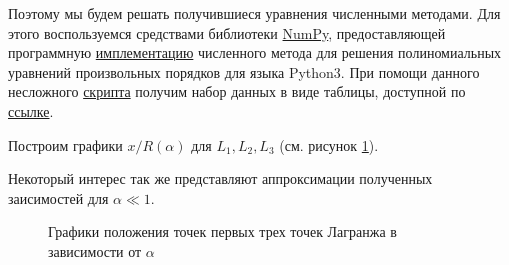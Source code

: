 \documentclass[12pt]{article}
\begin{document}
    \par Поэтому мы будем решать получившиеся уравнения численными методами. Для
    этого воспользуемся средствами библиотеки \href{https://numpy.org}{NumPy},
    предоставляющей программную    
    \href{https://numpy.org/doc/stable/reference/generated/numpy.roots.html#r01a8f58ef25b-1}
    {имплементацию}
    численного метода для решения
    полиномиальных уравнений произвольных порядков для языка Python3.
    При помощи данного несложного 
    \href{https://github.com/victorbaldin56/VPV/blob/main/2023/lagrange_solver/lagrange_solver.py}
    {скрипта} получим набор данных в виде таблицы, доступной по
    \href{https://github.com/victorbaldin56/VPV/blob/main/2023/lagrange_solver/lagrange_solver_data.csv}
    {ссылке}.

    \par Построим графики $x/R(\alpha)$ для $L_1, L_2, L_3$ (см. рисунок \ref{sss}).

    \par Некоторый интерес так же представляют аппроксимации полученных 
    заисимостей для $\alpha \ll 1$.
    
    \begin{figure}[H]
        \centering
        
        \caption{Графики положения точек первых трех точек Лагранжа в зависимости от 
        $\alpha$}
        \label{sss}
    \end{figure}

    
    
\end{document}
